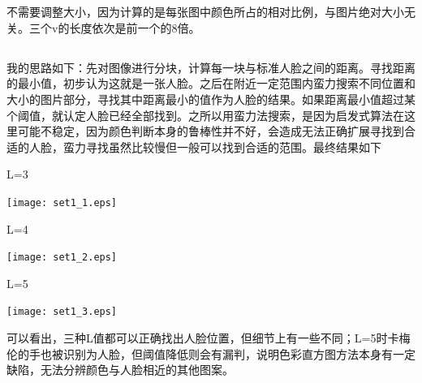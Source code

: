 \documentclass{article}
\begin{document}
\section{}
\subsection{}
\noindent{}
\par 不需要调整大小，因为计算的是每张图中颜色所占的相对比例，与图片绝对大小无关。三个v的长度依次是前一个的8倍。

\subsection{}
\noindent{}
\par 我的思路如下：先对图像进行分块，计算每一块与标准人脸之间的距离。寻找距离的最小值，初步认为这就是一张人脸。之后在附近一定范围内蛮力搜索不同位置和大小的图片部分，寻找其中距离最小的值作为人脸的结果。如果距离最小值超过某个阈值，就认定人脸已经全部找到。之所以用蛮力法搜索，是因为启发式算法在这里可能不稳定，因为颜色判断本身的鲁棒性并不好，会造成无法正确扩展寻找到合适的人脸，蛮力寻找虽然比较慢但一般可以找到合适的范围。最终结果如下
\par L=3
\begin{center}\texttt{[image: set1\_1.eps]}\end{center}
\par L=4
\begin{center}\texttt{[image: set1\_2.eps]}\end{center}
\par L=5
\begin{center}\texttt{[image: set1\_3.eps]}\end{center}
可以看出，三种L值都可以正确找出人脸位置，但细节上有一些不同；L=5时卡梅伦的手也被识别为人脸，但阈值降低则会有漏判，说明色彩直方图方法本身有一定缺陷，无法分辨颜色与人脸相近的其他图案。
\end{document}

